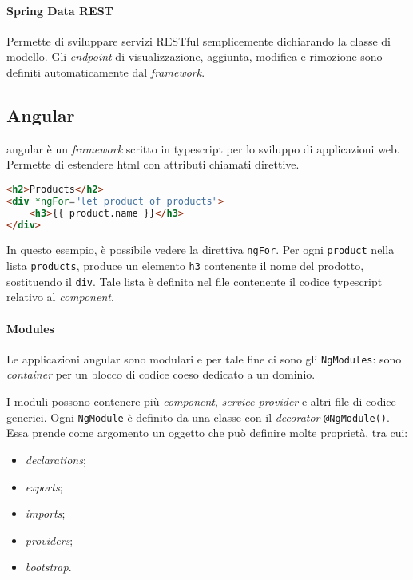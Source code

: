 \paragraph*{Spring Data REST} Permette di sviluppare servizi RESTful semplicemente dichiarando la classe di modello.
Gli \textit{endpoint} di visualizzazione, aggiunta, modifica e rimozione sono definiti automaticamente dal \textit{framework}.

\subsection{Angular}

\gls{angular} è un \textit{framework} scritto in \gls{typescript} per lo sviluppo di applicazioni web.
Permette di estendere \acrshort{html} con attributi chiamati direttive.

\begin{tcolorbox}
	\begin{lstlisting}[language=html]
<h2>Products</h2>
<div *ngFor="let product of products">
    <h3>{{ product.name }}</h3>
</div>
	\end{lstlisting}
\end{tcolorbox}

In questo esempio, è possibile vedere la direttiva \texttt{ngFor}. Per ogni \texttt{product} nella lista \texttt{products}, produce un elemento \texttt{h3} contenente il nome del prodotto, sostituendo il \texttt{div}. Tale lista è definita nel file contenente il codice \gls{typescript} relativo al \textit{component}.

\paragraph*{Modules}
Le applicazioni \gls{angular} sono modulari e per tale fine ci sono gli \texttt{NgModules}: sono \textit{container} per un blocco di codice coeso dedicato a un dominio.

I moduli possono contenere più \textit{component}, \textit{service provider} e altri file di codice generici. Ogni \texttt{NgModule} è definito da una classe con il \textit{decorator} \texttt{@NgModule()}. Essa prende come argomento un oggetto che può definire molte proprietà, tra cui:
\begin{itemize}
	\item \textit{declarations};
	\item \textit{exports};
	\item \textit{imports};
	\item \textit{providers};
	\item \textit{bootstrap}.
\end{itemize}

